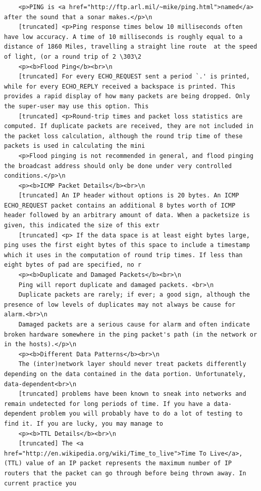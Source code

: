 \documentclass[12pt]{article} %
\begin{document}
\begin{verbatim}
    <p>PING is <a href="http://ftp.arl.mil/~mike/ping.html">named</a> after the sound that a sonar makes.</p>\n
    [truncated] <p>Ping response times below 10 milliseconds often have low accuracy. A time of 10 milliseconds is roughly equal to a distance of 1860 Miles, travelling a straight line route  at the speed of light, (or a round trip of 2 \303\2
    <p><b>Flood Ping</b><br>\n
    [truncated] For every ECHO_REQUEST sent a period `.' is printed, while for every ECHO_REPLY received a backspace is printed. This provides a rapid display of how many packets are being dropped. Only the super-user may use this option. This
    [truncated] <p>Round-trip times and packet loss statistics are computed. If duplicate packets are received, they are not included in the packet loss calculation, although the round trip time of these packets is used in calculating the mini
    <p>Flood pinging is not recommended in general, and flood pinging the broadcast address should only be done under very controlled conditions.</p>\n
    <p><b>ICMP Packet Details</b><br>\n
    [truncated] An IP header without options is 20 bytes. An ICMP ECHO_REQUEST packet contains an additional 8 bytes worth of ICMP header followed by an arbitrary amount of data. When a packetsize is given, this indicated the size of this extr
    [truncated] <p> If the data space is at least eight bytes large, ping uses the first eight bytes of this space to include a timestamp which it uses in the computation of round trip times. If less than eight bytes of pad are specified, no r
    <p><b>Duplicate and Damaged Packets</b><br>\n
    Ping will report duplicate and damaged packets. <br>\n
    Duplicate packets are rarely; if ever; a good sign, although the presence of low levels of duplicates may not always be cause for alarm.<br>\n
    Damaged packets are a serious cause for alarm and often indicate broken hardware somewhere in the ping packet's path (in the network or in the hosts).</p>\n
    <p><b>Different Data Patterns</b><br>\n
    The (inter)network layer should never treat packets differently depending on the data contained in the data portion. Unfortunately, data-dependent<br>\n
    [truncated] problems have been known to sneak into networks and remain undetected for long periods of time. If you have a data-dependent problem you will probably have to do a lot of testing to find it. If you are lucky, you may manage to 
    <p><b>TTL Details</b><br>\n
    [truncated] The <a href="http://en.wikipedia.org/wiki/Time_to_live">Time To Live</a>, (TTL) value of an IP packet represents the maximum number of IP routers that the packet can go through before being thrown away. In current practice you 

\end{verbatim}
\end{document}
